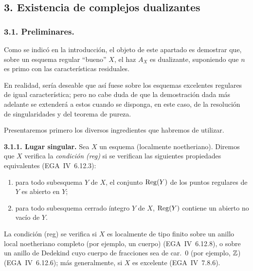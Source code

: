 \subsection*{3. Existencia de complejos dualizantes}

\subsubsection*{3.1. Preliminares.}

Como se indicó en la introducción, el objeto de este apartado es demostrar que, sobre un esquema regular 
\textquotedblleft bueno\textquotedblright{} $X$, el haz $A_X$ es dualizante, suponiendo que $n$ es primo con las características residuales.

En realidad, sería deseable que así fuese sobre los esquemas excelentes regulares de igual característica; pero no cabe duda de que la demostración dada más adelante se extenderá a estos cuando se disponga, en este caso, de la resolución de singularidades y del teorema de pureza.

Presentaremos primero los diversos ingredientes que habremos de utilizar.

\textbf{3.1.1. Lugar singular.} Sea $X$ un esquema (localmente noetheriano). Diremos que $X$ verifica la \emph{condición (reg)} si se verifican las siguientes propiedades equivalentes (EGA~IV~6.12.3):
\begin{enumerate}
\item[(i)] para todo subesquema $Y$ de $X$, el conjunto $\operatorname{Reg}(Y)$ de los puntos regulares de $Y$ es abierto en $Y$;
\item[(ii)] para todo subesquema cerrado íntegro $Y$ de $X$, $\operatorname{Reg}(Y)$ contiene un abierto no vacío de $Y$.
\end{enumerate}

La condición (reg) se verifica si $X$ es localmente de tipo finito sobre un anillo local noetheriano completo (por ejemplo, un cuerpo) (EGA~IV~6.12.8), o sobre un anillo de Dedekind cuyo cuerpo de fracciones sea de car.~0 (por ejemplo, $\mathbb{Z}$) (EGA~IV~6.12.6); más generalmente, si $X$ es excelente (EGA~IV~7.8.6).

